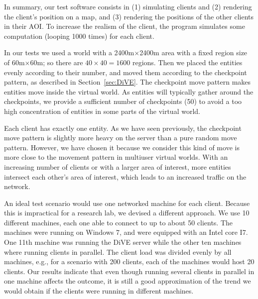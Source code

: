 \documentclass[]{elsarticle}
\begin{document}
In summary, our test software consists in (1) simulating clients and (2) rendering the client's position on a map, and (3) rendering the positions of the other clients in their AOI. To increase the realism of the client, the program simulates some computation (looping 1000 times) for each client.

In our tests we used a world with a 2400m$\times$2400m area with a fixed region size of 60m$\times$60m; so there are $40\times40=1600$ regions. Then we placed the entities evenly according to their number, and moved them according to the checkpoint pattern, as described in Section~\ref{sec:DiVE}. The checkpoint move pattern makes entities move inside the virtual world. As entities will typically gather around the checkpoints, we provide a sufficient number of checkpoints (50) to avoid a too high concentration of entities in some parts of the virtual world.


Each client has exactly one entity. %
As we have seen previously, the checkpoint move pattern is slightly more heavy on the server than a pure random move pattern. However, we have chosen it because we consider this kind of move is more close to the movement pattern in multiuser virtual worlds.
With an increasing number of clients or with a larger area of interest, more entities intersect each other's area of interest, which leads to an increased traffic on the network.

An ideal test scenario would use one networked machine for each client. Because this is impractical for a research lab, we devised a different approach. We use 10 different machines, each one able to connect to up to about 50 clients. The machines were running on Windows 7, and were equipped with an Intel core I7. One 11th machine was running the DiVE server while the other ten machines where running clients in parallel. The client load was divided evenly by all machines, e.g., for a scenario with 200 clients, each of the machines would host 20 clients. Our results indicate that even though running several clients in parallel in one machine affects the outcome, it is still a good approximation of the trend we would obtain if the clients were running in different machines.
\end{document}

